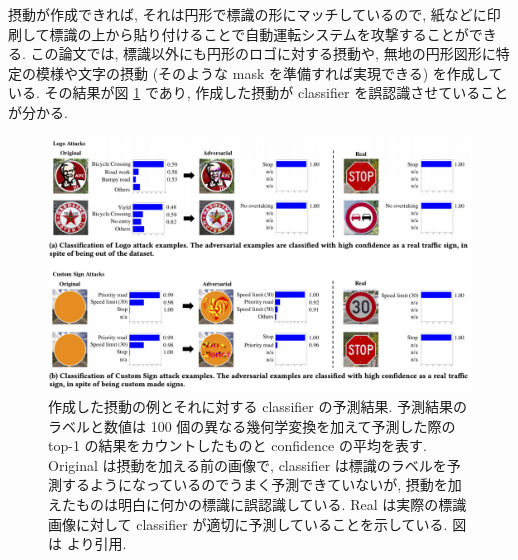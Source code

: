摂動が作成できれば, それは円形で標識の形にマッチしているので, 紙などに印刷して標識の上から貼り付けることで自動運転システムを攻撃することができる.
この論文では, 標識以外にも円形のロゴに対する摂動や, 無地の円形図形に特定の模様や文字の摂動 (そのような mask を準備すれば実現できる) を作成している.
その結果が図 \ref{fig:darts-example} であり, 作成した摂動が classifier を誤認識させていることが分かる.
%
\begin{figure}[htbp]
\begin{center}
\includegraphics[width=14.0cm]{figures/darts-example.pdf}
\end{center}
\caption{
作成した摂動の例とそれに対する classifier の予測結果.
予測結果のラベルと数値は 100 個の異なる幾何学変換を加えて予測した際の top-1 の結果をカウントしたものと confidence の平均を表す.
Original は摂動を加える前の画像で, classifier は標識のラベルを予測するようになっているのでうまく予測できていないが, 摂動を加えたものは明白に何かの標識に誤認識している.
Real は実際の標識画像に対して classifier が適切に予測していることを示している.
図は \cite{sitawarin2018darts} より引用.
}
\label{fig:darts-example}
\end{figure}
%

